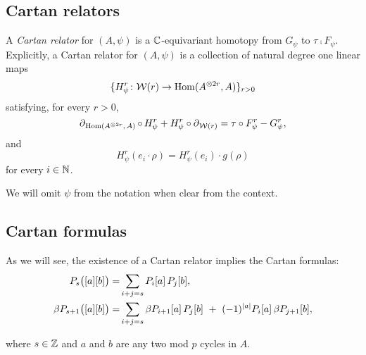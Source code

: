 \subsection{Cartan relators}\label{ss:cartan_relators}

A \textit{Cartan relator} for $(A,\psi)$ is a $\mathbb{C}$-equivariant homotopy from $G_\psi$ to $\tau \comp F_\psi$.
Explicitly, a Cartan relator for $(A,\psi)$ is a collection of natural degree one linear maps
\[
\{H^r_\psi \colon \mathcal{W}(r) \to \mathrm{Hom}(A^{\otimes 2r}, A)\}_{r>0}
\]
satisfying, for every $r > 0$,
\[
\operatorname{\partial}_{\mathrm{Hom}(A^{\otimes 2r},\, A)} \mathbin{\circ} \,H^r_\psi + H^r_\psi \mathbin{\circ} \operatorname{\partial}_{\mathcal{W}(r)} = \tau \mathbin{\circ} F^r_\psi - G^r_\psi,
\]
and
\[
H^r_\psi(e_i \cdot \rho) = H^r_\psi(e_i) \cdot g(\rho)
\]
for every $i \in \mathbb{N}$.

We will omit $\psi$ from the notation when clear from the context.

\subsection{Cartan formulas}

As we will see, the existence of a Cartan relator implies the Cartan formulas:
\begin{align*}
	P_{s}\big([a][b]\big) =&
	\sum_{i+j=s} P_i[a] \, P_j[b], \\
	\beta P_{s+1}\big([a][b]\big) =&
	\sum_{i+j=s} \beta P_{i+1}[a] \, P_j[b] \ +\ (-1)^{\lvert a\rvert} P_i[a] \, \beta P_{j+1}[b],
\end{align*}


where $s \in \mathbb{Z}$ and $a$ and $b$ are any two mod $p$ cycles in $A$.

